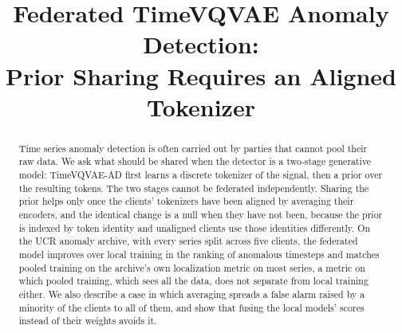 \documentclass[conference]{IEEEtran}
\begin{document}

\title{Federated TimeVQVAE Anomaly Detection:\\
Prior Sharing Requires an Aligned Tokenizer}

\author{
}

\maketitle

\begin{abstract}
Time series anomaly detection is often carried out by parties that cannot pool their raw data. We
ask what should be shared when the detector is a two-stage generative model: TimeVQVAE-AD first
learns a discrete tokenizer of the signal, then a prior over the resulting tokens. The two stages cannot be federated independently. Sharing the prior
helps only once the clients' tokenizers have been aligned by averaging their encoders, and the
identical change is a null when they have not been, because the prior is indexed by token identity
and unaligned clients use those identities differently. On the UCR anomaly archive, with every
series split across five clients, the federated model improves over local training in the ranking of
anomalous timesteps and matches pooled training on the archive's own localization metric on most
series, a metric on which pooled training, which sees all the data, does not separate from local
training either. We also describe a case in which averaging spreads a false alarm raised by a
minority of the clients to all of them, and show that fusing the local models' scores instead of
their weights avoids it.
\end{abstract}
\end{document}
